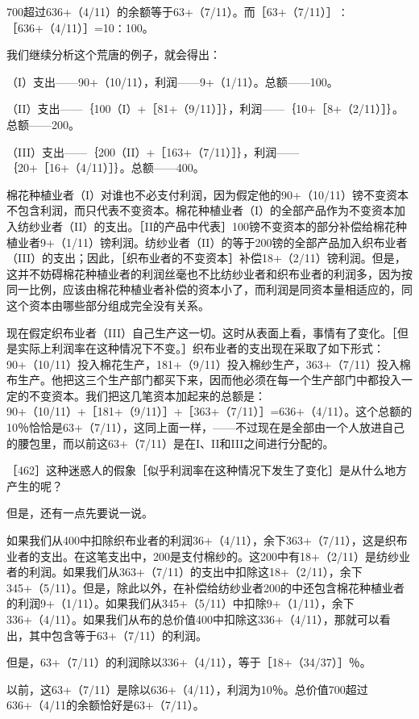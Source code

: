 700超过636+（4/11）的余额等于63+（7/11）。而［63+（7/11）］∶［636+（4/11）］=10∶100。

我们继续分析这个荒唐的例子，就会得出：

（I）支出——90+（10/11），利润——9+（1/11）。总额——100。

（II）支出——｛100（I）+［81+（9/11）］｝，利润——｛10+［8+（2/11）］｝。总额——200。

（III）支出——｛200（II）+［163+（7/11）］｝，利润——｛20+［16+（4/11）］｝。总额——400。

棉花种植业者（I）对谁也不必支付利润，因为假定他的90+（10/11）镑不变资本不包含利润，而只代表不变资本。棉花种植业者（I）的全部产品作为不变资本加入纺纱业者（II）的支出。［II的产品中代表］100镑不变资本的部分补偿给棉花种植业者9+（1/11）镑利润。纺纱业者（II）的等于200镑的全部产品加入织布业者（III）的支出；因此，［织布业者的不变资本］补偿18+（2/11）镑利润。但是，这并不妨碍棉花种植业者的利润丝毫也不比纺纱业者和织布业者的利润多，因为按同一比例，应该由棉花种植业者补偿的资本小了，而利润是同资本量相适应的，同这个资本由哪些部分组成完全没有关系。

现在假定织布业者（III）自己生产这一切。这时从表面上看，事情有了变化。［但是实际上利润率在这种情况下不变。］织布业者的支出现在采取了如下形式：90+（10/11）投入棉花生产，181+（9/11）投入棉纱生产，363+（7/11）投入棉布生产。他把这三个生产部门都买下来，因而他必须在每一个生产部门中都投入一定的不变资本。我们把这几笔资本加起来的总额是：90+（10/11）+［181+（9/11）］+［363+（7/11）］=636+（4/11）。这个总额的10％恰恰是63+（7/11），这同上面一样，——不过现在是全部由一个人放进自己的腰包里，而以前这63+（7/11）是在I、II和III之间进行分配的。

［462］这种迷惑人的假象［似乎利润率在这种情况下发生了变化］是从什么地方产生的呢？

但是，还有一点先要说一说。

如果我们从400中扣除织布业者的利润36+（4/11），余下363+（7/11），这是织布业者的支出。在这笔支出中，200是支付棉纱的。这200中有18+（2/11）是纺纱业者的利润。如果我们从363+（7/11）的支出中扣除这18+（2/11），余下345+（5/11）。但是，除此以外，在补偿给纺纱业者200的中还包含棉花种植业者的利润9+（1/11）。如果我们从345+（5/11）中扣除9+（1/11），余下336+（4/11）。如果我们从布的总价值400中扣除这336+（4/11），那就可以看出，其中包含等于63+（7/11）的利润。

但是，63+（7/11）的利润除以336+（4/11），等于［18+（34/37）］％。

以前，这63+（7/11）是除以636+（4/11），利润为10％。总价值700超过636+（4/11的余额恰好是63+（7/11）。

